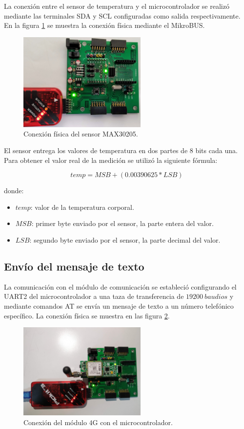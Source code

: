 \documentclass[journal]{IEEEtran}
\begin{document}
La conexión entre el sensor de temperatura y el microcontrolador se realizó mediante las terminales SDA y SCL configuradas como salida respectivamente. En la figura \ref{fig:ConexionFisicaMAX30205} se muestra la conexión física mediante el MikroBUS.

\begin{figure}[htbp!]
	\centering
	\includegraphics[width=2.5in]{AvancesPruebas/imagenes/MAX30205ConexionFisica.jpg}
	\caption{Conexión física del sensor MAX30205.}
	\label{fig:ConexionFisicaMAX30205}
\end{figure}

El sensor entrega los valores de temperatura en dos partes de 8 bits cada una. Para obtener el valor real de la medición se utilizó la siguiente fórmula:

\begin{equation}
	temp = MSB + (0.00390625 * LSB)
\end{equation}

donde: 
\begin{itemize}
	\item $temp$: valor de la temperatura corporal.
	\item $MSB$: primer byte enviado por el sensor, la parte entera del valor.
	\item $LSB$: segundo byte enviado por el sensor, la parte decimal del valor.
\end{itemize}


\subsection{Envío del mensaje de texto}
La comunicación con el módulo de comunicación se estableció configurando el UART2 del microcontrolador a una taza de transferencia de $19200\ baudios$ y mediante comandos AT se envía un mensaje de texto a un número telefónico específico. La conexión física se muestra en las figura \ref{fig:ConexionFisicaGSM}.

\begin{figure}[htbp!]
	\centering
	\includegraphics[width=2.5in]{AvancesPruebas/imagenes/ConexionFisicaGSM.jpg}
	\caption{Conexión del módulo 4G con el microcontrolador.}
	\label{fig:ConexionFisicaGSM}
\end{figure}
\end{document}
